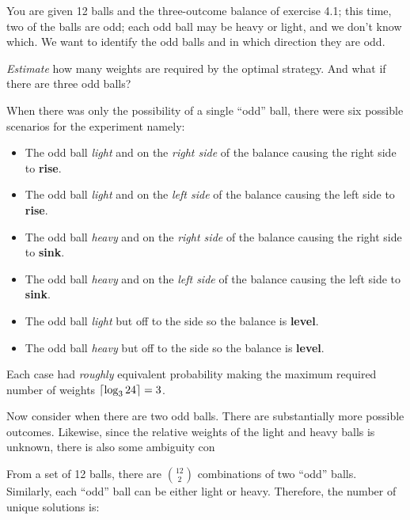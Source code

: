 \begin{problem}{4}{14}
  You are given 12 balls and the three-outcome balance of exercise 4.1; this time, two of the balls are odd; each odd ball may be heavy or light, and we don't know which.  We want to identify the odd balls and in which direction they are odd.
\end{problem}



\begin{subproblem}
  \textit{Estimate} how many weights are required by the optimal strategy.  And what if there are three odd balls?
\end{subproblem}

  When there was only the possibility of a single ``odd'' ball, there were six possible scenarios for the experiment namely:
  
  \begin{itemize}[wide]
    \item The odd ball \textit{light} and on the \textit{right side} of the balance causing the right side to \textbf{rise}.
    \item The odd ball \textit{light} and on the \textit{left side} of the balance causing the left side to \textbf{rise}.
    
    \item The odd ball \textit{heavy} and on the \textit{right side} of the balance causing the right side to \textbf{sink}.
    \item The odd ball \textit{heavy} and on the \textit{left side} of the balance causing the left side to \textbf{sink}.
    
    \item The odd ball \textit{light} but off to the side so the balance is \textbf{level}.
    \item The odd ball \textit{heavy} but off to the side so the balance is \textbf{level}.
  \end{itemize}

  \noindent
  Each case had \textit{roughly} equivalent probability making the maximum required number of weights ${\lceil \log_{3} 24 \rceil=3}$.
  
  Now consider when there are two odd balls.  There are substantially more possible outcomes.  Likewise, since the relative weights of the light and heavy balls is unknown, there is also some ambiguity con

  From a set of 12 balls, there are $\binom{12}{2}$ combinations of two ``odd'' balls.  Similarly, each ``odd'' ball can be either light or heavy.  Therefore, the number of unique solutions is:

